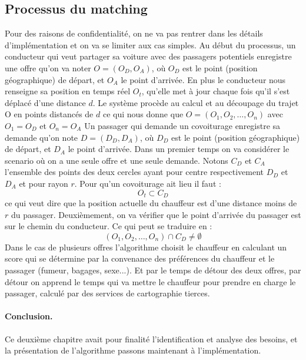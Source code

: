 \subsection{Processus du matching} %
Pour des raisons de confidentialité, on ne va pas rentrer dans les détails d'implémentation et on va se limiter aux cas simples.\cite{schreieck2016matching}\newline
Au début du processus, un conducteur qui veut partager sa voiture avec des passagers potentiels enregistre 
une offre qu'on va noter $O = (O_D, O_A)$, où $O_D$ est le point (position géographique) de départ, et $O_A$
le point d'arrivée. En plus le conducteur nous renseigne sa position en temps réel $O_t$, qu'elle met à jour chaque fois qu'il s'est déplacé d'une distance $d$. Le système procède au calcul et au découpage du trajet O en points distancés de $d$ ce qui nous donne que $O = (O_{1}, O_{2},\ldots , O_{n})$ avec $O_{1} = O_D$ et $O_{n} = O_A$\newline
Un passager qui demande un covoiturage enregistre sa demande qu'on note $D = (D_D, D_A)$, où $D_D$ est le point (position géographique) de départ, et $D_A$ le point d'arrivée.\newline
Dans un premier temps on va considérer le scenario où on a une seule offre et une seule demande. Notons $C_D$ et $C_A$ l'ensemble des points des deux cercles ayant pour centre respectivement $D_D$ et $D_A$ et pour rayon $r$.
Pour qu'un covoiturage ait lieu il faut : 
\begin{equation}
O_t \subset C_D 
\label{eqution1}
\end{equation}
ce qui veut dire que la position actuelle du chauffeur est d'une distance moins de $r$ du passager.\newline
Deuxièmement, on va vérifier que le point d'arrivée du passager est sur le chemin du conducteur. Ce qui peut se traduire en :
\begin{equation}
(O_{1}, O_{2},\ldots , O_{n}) \cap C_D \ne \emptyset
\label{eqution2}
\end{equation}
Dans le cas de plusieurs offres l'algorithme choisit le chauffeur en calculant un score qui se détermine par la convenance des préférences du chauffeur et le passager (fumeur, bagages, sexe...). Et par le temps de détour des deux offres, par détour on apprend le temps qui va mettre le chauffeur pour prendre en charge le passager, calculé par des services de cartographie tierces.
\newline
\paragraph{Conclusion.} Ce deuxième chapitre avait pour finalité l'identification et analyse des besoins, et la présentation de l'algorithme passons maintenant à l'implémentation.